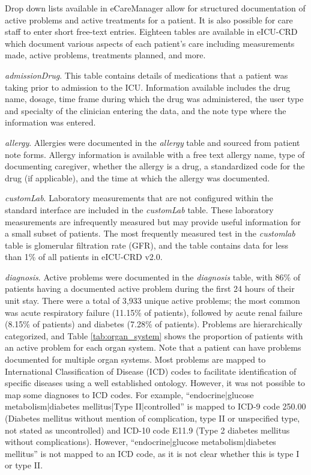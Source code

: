 \documentclass[english]{article}
\newcommand{\tblname}[1]{\emph{#1}}
\begin{document}
Drop down lists available in eCareManager allow for structured
documentation of active problems and active treatments for a patient.
It is also possible for care staff to enter short free-text entries.
Eighteen tables are available in eICU-CRD which document various aspects of each patient's care including measurements made, active problems, treatments planned, and more.

\tblname{admissionDrug}. This table contains details of medications that a patient was taking prior to admission to the ICU.
Information available includes the drug name, dosage, time frame during which the drug was administered, the user type and specialty of the clinician entering the data, and the note type where the information was entered.

\tblname{allergy}. Allergies were documented in the \tblname{allergy} table and sourced from patient note forms. Allergy information is available with a free text allergy name, type of documenting caregiver, whether the allergy is a drug, a standardized code for the drug (if applicable), and the time at which the allergy was documented.

\tblname{customLab}. Laboratory measurements that are not configured within the standard interface are included in the \tblname{customLab} table. These laboratory measurements are infrequently measured but may provide useful information for a small subset of patients. The most frequently measured test in the \tblname{customlab} table is glomerular filtration rate (GFR), and the table contains data for less than 1\% of all patients in eICU-CRD v2.0.

\tblname{diagnosis}. Active problems were documented in the \tblname{diagnosis} table,
with 86\% of patients having a documented active problem during
the first 24 hours of their unit stay. There were a total of 3,933
unique active problems; the most common was acute respiratory failure
(11.15\% of patients), followed by acute renal failure (8.15\% of
patients) and diabetes (7.28\% of patients). Problems are hierarchically
categorized, and Table \ref{tab:organ_system} shows the proportion of patients with an active problem for each organ system. Note that a patient can have problems
documented for multiple organ systems.
Most problems are mapped to International Classification of Disease (ICD) codes to facilitate identification of specific diseases using a well established ontology. However, it was not possible to map some diagnoses to ICD codes. For example, ``endocrine|glucose metabolism|diabetes mellitus|Type II|controlled'' is mapped to ICD-9 code 250.00 (Diabetes mellitus without mention of complication, type II or unspecified type, not stated as uncontrolled) and ICD-10 code E11.9 (Type 2 diabetes mellitus without complications).
However, ``endocrine|glucose metabolism|diabetes mellitus'' is not mapped to an ICD code, as it is not clear whether this is type I or type II.
\end{document}
